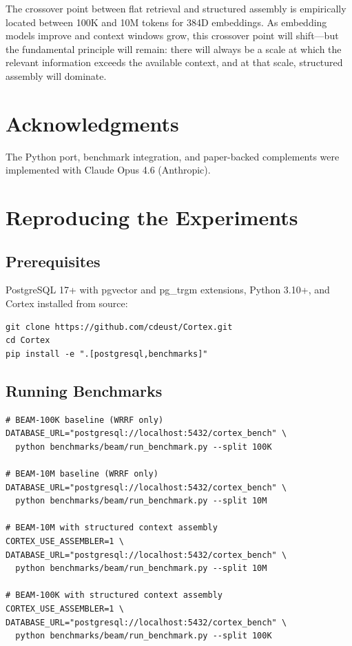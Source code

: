 \documentclass[11pt]{article}
\begin{document}
The crossover point between flat retrieval and structured assembly is
empirically located between 100K and 10M tokens for 384D embeddings.
As embedding models improve and context windows grow, this crossover
point will shift---but the fundamental principle will remain: there
will always be a scale at which the relevant information exceeds the
available context, and at that scale, structured assembly will
dominate.

\section*{Acknowledgments}

The Python port, benchmark integration, and paper-backed complements
were implemented with Claude Opus 4.6 (Anthropic).

\appendix

\section{Reproducing the Experiments}
\label{app:reproducing}

\subsection{Prerequisites}

PostgreSQL 17+ with pgvector and pg\_trgm extensions, Python 3.10+,
and Cortex installed from source:

\begin{verbatim}
git clone https://github.com/cdeust/Cortex.git
cd Cortex
pip install -e ".[postgresql,benchmarks]"
\end{verbatim}

\subsection{Running Benchmarks}

\begin{verbatim}
# BEAM-100K baseline (WRRF only)
DATABASE_URL="postgresql://localhost:5432/cortex_bench" \
  python benchmarks/beam/run_benchmark.py --split 100K

# BEAM-10M baseline (WRRF only)
DATABASE_URL="postgresql://localhost:5432/cortex_bench" \
  python benchmarks/beam/run_benchmark.py --split 10M

# BEAM-10M with structured context assembly
CORTEX_USE_ASSEMBLER=1 \
DATABASE_URL="postgresql://localhost:5432/cortex_bench" \
  python benchmarks/beam/run_benchmark.py --split 10M

# BEAM-100K with structured context assembly
CORTEX_USE_ASSEMBLER=1 \
DATABASE_URL="postgresql://localhost:5432/cortex_bench" \
  python benchmarks/beam/run_benchmark.py --split 100K
\end{verbatim}
\end{document}
